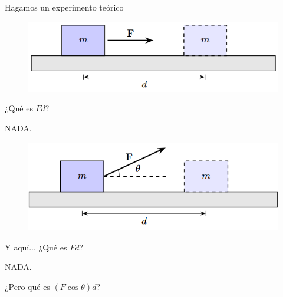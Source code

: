 \begin{frame}
    \begin{center}
        \Huge Hagamos un experimento teórico
    \end{center}
\end{frame}

\begin{frame}
    \begin{figure}
        \centering
        \includegraphics[width=0.8\linewidth]{figures/exp-teo1.png}
    \end{figure}

    \begin{center}
        \large ¿Qué es $Fd$?
    \end{center}

    \pause \begin{center}
        \LARGE NADA.
    \end{center}
    
\end{frame}

\begin{frame}
    \begin{figure}
        \centering
        \includegraphics[width=0.8\linewidth]{figures/exp-teo2.png}
    \end{figure}

    \begin{center}
        \large Y aquí... ¿Qué es $Fd$?
    \end{center}

    \pause \begin{center}
        \LARGE NADA.
    \end{center}

    \pause \begin{center}
        \large ¿Pero qué es $(F\cos\theta)d$?
    \end{center}
    
    
\end{frame}

